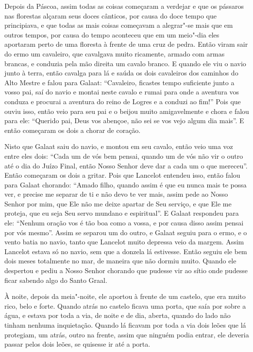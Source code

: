 Depois da Páscoa, assim todas as coisas começaram a verdejar e que os pássaros
nas florestas alçaram seus doces cânticos, por causa do doce tempo que
principiava, e que todas as mais coisas começavam a alegrar"-se mais que em
outros tempos, por causa do tempo aconteceu que em um meio"-dia eles aportaram
perto de uma floresta à frente de uma cruz de pedra. Então viram sair do ermo
um cavaleiro, que cavalgava muito ricamente, armado com armas brancas, e
conduzia pela mão direita um cavalo branco. E quando ele viu o navio junto à
terra, então cavalga para lá e saúda os dois cavaleiros dos caminhos do Alto
Mestre e falou para Galaat: “Cavaleiro, ficastes tempo suficiente junto a vosso
pai, saí do navio e montai neste cavalo e rumai para onde a aventura vos
conduza e procurai a aventura do reino de Logres e a conduzi ao fim!” Pois que
ouviu isso, então veio para seu pai e o beijou muito amigavelmente e chora e
falou para ele: “Querido pai, Deus vos abençoe, não sei se vos vejo algum dia
mais”. E então começaram os dois a chorar de coração.

Nisto que Galaat saiu do navio, e montou em seu cavalo, então veio uma voz entre
eles dois: “Cada um de vós bem pensai, quando um de vós não vir o outro até o
dia do Juízo Final, então Nosso Senhor deve dar a cada um o que mereceu”. 
Então começaram os dois a gritar. Pois que Lancelot entendeu isso, então
falou para Galaat chorando: “Amado filho, quando assim é que eu nunca mais te
possa ver, e precise me separar de ti e não devo te ver mais, assim pede ao
Nosso Senhor por mim, que Ele não me deixe apartar de Seu serviço, e que Ele me
proteja, que eu seja Seu servo mundano e espiritual”. E Galaat respondeu para
ele: “Nenhum oração vos é tão boa como a vossa, e por causa disso assim pensai
por vós mesmo”. Assim se separou um do outro, e Galaat seguiu para o ermo, e o
vento batia no navio, tanto que Lancelot muito depressa veio da margem. Assim
Lancelot estava só no navio, sem que a donzela lá estivesse. Então seguiu ele
bem dois meses totalmente no mar, de maneira que não dormiu muito. Quando ele
despertou e pediu a Nosso Senhor chorando que pudesse vir ao sítio onde pudesse
ficar sabendo algo do Santo Graal. 

À noite, depois da meia"-noite, ele aportou à frente de um castelo, que era muito
rico, belo e forte. Quando atrás no castelo ficava uma porta, que saía por
sobre a água, e estava por toda a via, de noite e de dia, aberta, quando do
lado não tinham nenhuma inquietação. Quando lá ficavam por toda a via dois
leões que lá protegiam, um atrás, outro na frente, assim que ninguém podia
entrar, ele deveria passar pelos dois leões, se quisesse ir até a porta.

